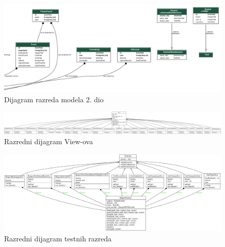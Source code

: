 			\begin{figure}[H]
					\centerfloat
					\advance{}
        					\includegraphics[scale=0.37]{dijagrami/final_models2.png} %
        					\caption{Dijagram razreda modela 2. dio}
        					\label{fig:DijagramRazredaView}
			\end{figure}
			
			\begin{figure}[H]
					\centerfloat
					\advance{}
        					\includegraphics[scale=0.145]{dijagrami/classes_view.png} %
        					\caption{Razredni dijagram View-ova}
        					\label{fig:idejniDijagramRazreda}
				\end{figure}
			
			\eject
			
			\begin{figure}[H]
					\centerfloat
					\advance{}
        					\includegraphics[scale=0.28]{dijagrami/classes_test.png} %
        					\caption{Razredni dijagram testnih razreda}
        					\label{fig:idejniDijagramRazreda}
				\end{figure}	
			\eject
		
